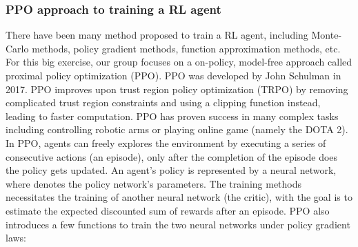 \documentclass[a4paper]{article}
\begin{document}
    \subsubsection{PPO approach to training a RL agent}
    There have been many method proposed to train a RL agent, including Monte-Carlo methods, policy gradient methods, function approximation methods, etc. For this big exercise, our group focuses on a on-policy, model-free approach called proximal policy optimization (PPO). PPO was developed by John Schulman in 2017. PPO improves upon trust region policy optimization (TRPO) by removing complicated trust region constraints and using a clipping function instead, leading to faster computation. PPO has proven success in many complex tasks including controlling robotic arms or playing online game (namely the DOTA 2).
    \vspace{0.2cm}\\
    In PPO, agents can freely explores the environment by executing a series of consecutive actions (an episode), only after the completion of the episode does the policy gets updated. An agent's policy is represented by a neural network, where \boldmath{$\theta$} denotes the policy network's parameters. The training methods necessitates the training of another neural network (the critic), with the goal is to estimate the expected discounted sum of rewards after an episode. PPO also introduces a few functions to train the two neural networks under policy gradient laws:
\end{document}
